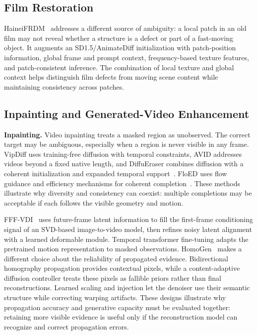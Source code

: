 \subsection{Film Restoration}
HaineiFRDM~\cite{haineifrdm} addresses a different source of ambiguity: a local patch in an old film may not reveal whether a structure is a defect or part of a fast-moving object. It augments an SD1.5/AnimateDiff initialization with patch-position information, global frame and prompt context, frequency-based texture features, and patch-consistent inference. The combination of local texture and global context helps distinguish film defects from moving scene content while maintaining consistency across patches.

\subsection{Inpainting and Generated-Video Enhancement}
\textbf{Inpainting.} Video inpainting treats a masked region as unobserved. The correct target may be ambiguous, especially when a region is never visible in any frame. VipDiff uses training-free diffusion with temporal constraints, AVID addresses videos beyond a fixed native length, and DiffuEraser combines diffusion with a coherent initialization and expanded temporal support~\cite{vipdiff,avid,diffueraser}. FloED uses flow guidance and efficiency mechanisms for coherent completion~\cite{floed}. These methods illustrate why diversity and consistency can coexist: multiple completions may be acceptable if each follows the visible geometry and motion.

FFF-VDI~\cite{fffvdi} uses future-frame latent information to fill the first-frame conditioning signal of an SVD-based image-to-video model, then refines noisy latent alignment with a learned deformable module. Temporal transformer fine-tuning adapts the pretrained motion representation to masked observations. HomoGen~\cite{homogen} makes a different choice about the reliability of propagated evidence. Bidirectional homography propagation provides contextual pixels, while a content-adaptive diffusion controller treats these pixels as fallible priors rather than final reconstructions. Learned scaling and injection let the denoiser use their semantic structure while correcting warping artifacts. These designs illustrate why propagation accuracy and generative capacity must be evaluated together: retaining more visible evidence is useful only if the reconstruction model can recognize and correct propagation errors.

